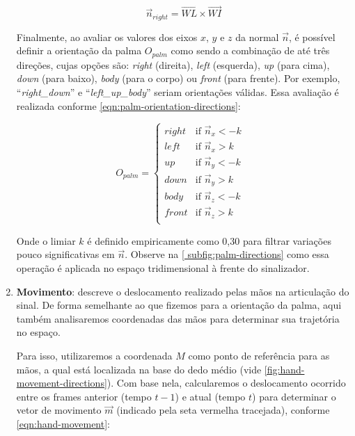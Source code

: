 \begin{enumerate}
    \begin{equation}
        \label{eqn:normal-palm-right}
        \overrightarrow{n}_{right} = \overrightarrow{WL} \times \overrightarrow{WI}
    \end{equation}


    Finalmente, ao avaliar os valores dos eixos \(x\), \(y\) e \(z\) da normal \(\overrightarrow{n}\), é possível definir a orientação da palma \(O_{palm}\) como sendo a combinação de até três direções, cujas opções são: \textit{right} (direita), \textit{left} (esquerda), \textit{up} (para cima), \textit{down} (para baixo), \textit{body} (para o corpo) ou \textit{front} (para frente).
    Por exemplo, ``\textit{right\_down}'' e ``\textit{left\_up\_body}'' seriam orientações válidas. Essa avaliação é realizada conforme \autoref{eqn:palm-orientation-directions}:
    
    \begin{equation}
        \label{eqn:palm-orientation-directions}
        O_{palm} =
        \begin{cases}
            right & \text{if $\overrightarrow{n}_x < {-k}$ } \\
            left  & \text{if $\overrightarrow{n}_x > {k}$ }  \\
            up    & \text{if $\overrightarrow{n}_y < {-k}$ } \\
            down  & \text{if $\overrightarrow{n}_y > {k}$ }  \\
            body  & \text{if $\overrightarrow{n}_z < {-k}$ } \\
            front & \text{if $\overrightarrow{n}_z > {k}$ }  \\
        \end{cases}
    \end{equation}

    Onde o limiar \(k\) é definido empiricamente como 0,30 para filtrar variações pouco significativas em \(\overrightarrow{n}\). Observe na \autoref{ subfig:palm-directions} como essa operação é aplicada no espaço tridimensional à frente do sinalizador.


    \item \textbf{Movimento}: descreve o deslocamento realizado pelas mãos na articulação do sinal.
    De forma semelhante ao que fizemos para a orientação da palma, aqui também analisaremos coordenadas das mãos para determinar sua trajetória no espaço.

    Para isso, utilizaremos a coordenada \(M\) como ponto de referência para as mãos, a qual está localizada na base do dedo médio (vide \autoref{fig:hand-movement-directions}). Com base nela, calcularemos o deslocamento ocorrido entre os frames anterior (tempo \(t-1\)) e atual (tempo \(t\)) para determinar o vetor de movimento \(\overrightarrow{m}\) (indicado pela seta vermelha tracejada), conforme \autoref{eqn:hand-movement}:
    

\end{enumerate}
